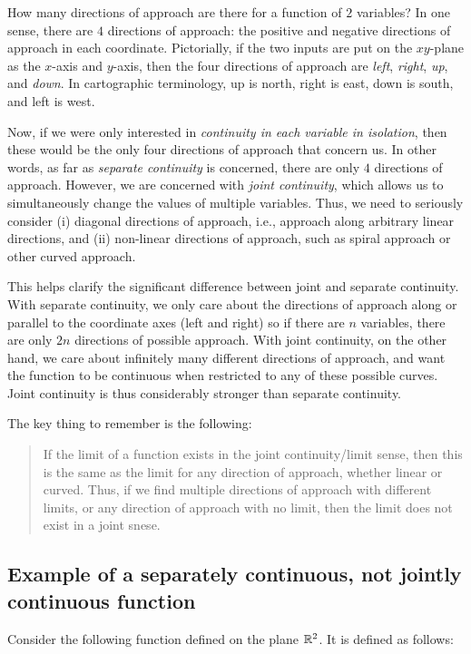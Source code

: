 \documentclass[10pt]{amsart}
\begin{document}
How many directions of approach are there for a function of $2$
variables? In one sense, there are $4$ directions of approach: the
positive and negative directions of approach in each
coordinate. Pictorially, if the two inputs are put on the $xy$-plane
as the $x$-axis and $y$-axis, then the four directions of approach are
{\em left}, {\em right}, {\em up}, and {\em down}. In cartographic
terminology, up is north, right is east, down is south, and left is
west.

Now, if we were only interested in {\em continuity in each variable in
isolation}, then these would be the only four directions of approach
that concern us. In other words, as far as {\em separate continuity}
is concerned, there are only $4$ directions of approach. However, we
are concerned with {\em joint continuity}, which allows us to
simultaneously change the values of multiple variables. Thus, we need
to seriously consider (i) diagonal directions of approach, i.e.,
approach along arbitrary linear directions, and (ii) non-linear
directions of approach, such as spiral approach or other curved approach.

This helps clarify the significant difference between joint and
separate continuity. With separate continuity, we only care about the
directions of approach along or parallel to the coordinate axes (left
and right) so if there are $n$ variables, there are only $2n$
directions of possible approach. With joint continuity, on the other
hand, we care about infinitely many different directions of approach,
and want the function to be continuous when restricted to any of these
possible curves. Joint continuity is thus considerably stronger than
separate continuity.

The key thing to remember is the following:

\begin{quote}
  If the limit of a function exists in the joint continuity/limit
  sense, then this is the same as the limit for any direction of
  approach, whether linear or curved. Thus, if we find multiple
  directions of approach with different limits, or any direction of
  approach with no limit, then the limit does not exist in a joint
  snese.
\end{quote}
\subsection{Example of a separately continuous, not jointly continuous function}

Consider the following function defined on the plane $\mathbb{R}^2$. It is
defined as follows:
\end{document}
